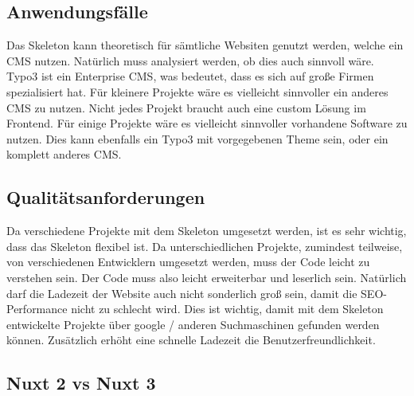\subsection{Anwendungsfälle}
\label{sec:Anwendungsfaelle}

Das Skeleton kann theoretisch für sämtliche Websiten genutzt werden, welche ein \acs{CMS} nutzen. Natürlich muss analysiert werden, ob dies auch sinnvoll wäre. Typo3 ist ein Enterprise \acs{CMS}, was bedeutet, dass es sich auf große Firmen spezialisiert hat. Für kleinere Projekte wäre es vielleicht sinnvoller ein anderes \acs{CMS} zu nutzen. Nicht jedes Projekt braucht auch eine custom Lösung im Frontend. Für einige Projekte wäre es vielleicht sinnvoller vorhandene Software zu nutzen. Dies kann ebenfalls ein Typo3 mit vorgegebenen Theme sein, oder ein komplett anderes \acs{CMS}.

\subsection{Qualitätsanforderungen}
\label{sec:Qualitaetsanforderungen}

Da verschiedene Projekte mit dem Skeleton umgesetzt werden, ist es sehr wichtig, dass das Skeleton flexibel ist. Da unterschiedlichen Projekte, zumindest teilweise, von verschiedenen Entwicklern umgesetzt werden, muss der Code leicht zu verstehen sein. Der Code muss also leicht erweiterbar und leserlich sein. 
Natürlich darf die Ladezeit der Website auch nicht sonderlich groß sein, damit die SEO-Performance nicht zu schlecht wird. Dies ist wichtig, damit mit dem Skeleton entwickelte Projekte über google / anderen Suchmaschinen gefunden werden können. Zusätzlich erhöht eine schnelle Ladezeit die Benutzerfreundlichkeit.

\subsection{Nuxt 2 vs Nuxt 3}
\label{sec:Nuxt 2 vs Nuxt 3}

